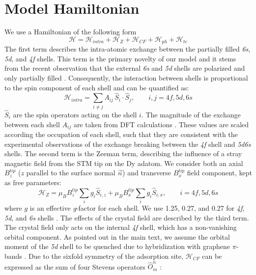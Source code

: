 \documentclass[reprint,amsmath,amssymb,aps,nofootinbib,onecolumn]{revtex4-2}
\begin{document}
\section{Model Hamiltonian}
We use a Hamiltonian of the following form
\begin{equation}
\mathcal{H} = \mathcal{H}_{intra} + \mathcal{H}_{Z} + \mathcal{H}_{CF}  + \mathcal{H}_{ph} + \mathcal{H}_{te}
\end{equation}
The first term describes the intra-atomic exchange between the partially filled \textit{6s}, \textit{5d}, and \textit{4f} shells. This term is the primary novelty of our model and it stems from the recent observation that the external \textit{6s} and \textit{5d} shells are polarized and only partially filled \cite{pivettaMeasuringIntraAtomicExchange2020}. Consequently, the interaction between shells is proportional to the spin component of each shell and can be quantified as:
\begin{equation}
\mathcal{H}_{intra} =\sum_{i\neq j} A_{ij} \, \hat{S}_{i} \cdot \hat{S}_{j} , \qquad i,j = 4f, 5d, 6s
\label{eqSI:H_intra}
\end{equation}
$\hat{S}_{i}$ are the spin operators acting on the shell $i$.
The magnitude of the exchange between each shell $A_{ij}$ are taken from DFT calculations \cite{Delin1997,pivettaMeasuringIntraAtomicExchange2020}. These values are scaled according the occupation of each shell, such that they are consistent with the experimental observations of the exchange breaking between the \textit{4f} shell and \textit{5d6s} shells. The second term is the Zeeman term, describing the influence of a stray magnetic field from the STM tip on the Dy adatom. We consider both an axial $B^{tip}_z$ ($z$ parallel to the surface normal $\vec n$) and transverse $B^{tip}_x$ field component, kept as free parameters:
\begin{equation}
\mathcal{H}_{Z} = \mu_{B} B^{tip}_z  \sum_{i} g_{i} \hat{S}_{i,z} + \mu_{B} B^{tip}_x  \sum_{i} g_{i} \hat{S}_{i,x}, \qquad i = 4f, 5d, 6s
\label{eq:zeeman}
\end{equation}
where $g$ is an effective \textit{g}-factor for each shell. We use 1.25, 0.27, and 0.27 for \textit{4f}, \textit{5d}, and \textit{6s} shells \cite{pivettaMeasuringIntraAtomicExchange2020}. The effects of the crystal field are described by the third term. The crystal field only acts on the internal \textit{4f} shell, which has a non-vanishing orbital component. As pointed out in the main text, we assume the orbital moment of the \textit{5d} shell to be quenched due to hybridization with graphene $\pi$-bands \cite{donati2014}. Due to the sixfold symmetry of the adsorption site, $\mathcal{H}_{CF}$ can be expressed as the sum of four Stevens operators $\hat{O}^{n}_{m}$ \cite{baltic2016, Stevens_1952}:
\end{document}
